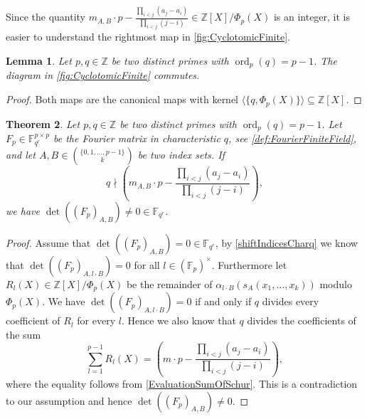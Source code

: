 \documentclass[a4paper]{article}
\newcommand{\Z}{\ensuremath{\mathbb{Z}}}
\newcommand{\F}{\mathbb{F}}
\newcommand{\ord}{\operatorname{ord}}
\newtheorem{theorem}{Theorem}[]
\newtheorem{lemma}[theorem]{Lemma}
\numberwithin{equation}{section}
\numberwithin{table}{section}
\numberwithin{figure}{section}
\begin{document}
Since the quantity $m_{A,B} \cdot p - \frac{\prod_{i<j}(a_j-a_i)}{\prod_{i<j}(j-i)} \in \Z[X]/\Phi_p(X)$ is an integer, it is easier to understand the rightmost map in \cref{fig:CyclotomicFinite}.

\begin{lemma}\label{thm:CommutingDiagrams}
    Let $p,q \in \Z$ be two distinct primes with $\ord_p(q)=p-1$. The diagram in \cref{fig:CyclotomicFinite} commutes.
\end{lemma}

\begin{proof}
    Both maps are the canonical maps with kernel $\langle \{q , \Phi_p(X)\}\rangle \subseteq \Z[X]$.

\end{proof}

\begin{theorem}\label{FourierFiniteFixedSets}
    Let $p,q \in \Z$ be two distinct primes with $\ord_p(q)=p-1$.
    Let $F_p \in \F_{q^r}^{p \times p}$ be the Fourier matrix in characteristic $q$, see \cref{def:FourierFiniteField}, and let $A,B \in \binom{\{0,1,\ldots,p-1\}}{k}$ be two index sets. If
    \[
    q \nmid \left( m_{A,B} \cdot p - \frac{\prod_{i<j}(a_j-a_i)}{\prod_{i<j}(j-i)}\right),
    \]
    we have $\det((F_p)_{A,B})\neq 0 \in \F_{q^r}$.
\end{theorem}

\begin{proof}
    Assume that $\det((F_p)_{A,B})=0 \in \F_{q^r}$, by \cref{shiftIndicesCharq} we know that
    $\det((F_p)_{A,l \cdot B})=0$ for all $l \in (\F_p)^\times$. Furthermore let $R_l(X) \in \Z[X]/\Phi_p(X)$ be the remainder of $\alpha_{l\cdot B}(s_A(x_1,\ldots,x_k))$ modulo $\Phi_p(X)$.
    We have $\det((F_p)_{A,l \cdot B})=0$ if and only if $q$ divides every coefficient of $R_l$ for every $l$. Hence we also know that $q$ divides the coefficients of the sum
    \[
    \sum_{l=1}^{p-1} R_l(X) = \left( m \cdot p - \frac{\prod_{i<j}(a_j-a_i)}{\prod_{i<j}(j-i)}\right),
    \]
    where the equality follows from \cref{EvaluationSumOfSchur}. This is a contradiction to our assumption and hence $\det((F_p)_{A,B}) \neq 0$.
    
\end{proof}
\end{document}
